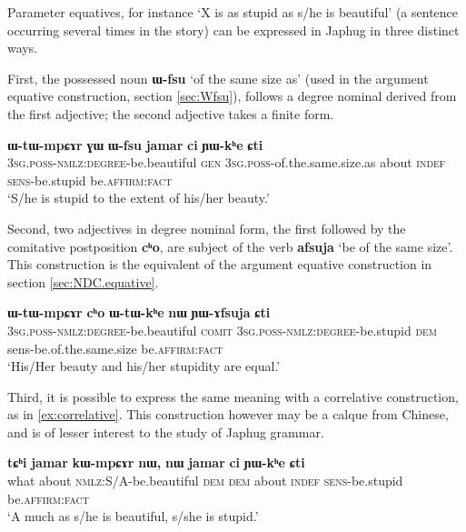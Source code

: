 \documentclass[oneside,a4paper,11pt]{article}
\newcommand{\ipa}[1]{{\phon\textbf{#1}}} %
\newcommand{\forme}[2]{\ipa{#1} `#2'}
\begin{document}
Parameter equatives, for instance `X is as stupid as s/he is beautiful' (a sentence occurring several times in the story) can be expressed in Japhug in three distinct ways.

First, the possessed noun \forme{ɯ-fsu}{of the same size as} (used in the argument equative construction, section \ref{sec:Wfsu}), follows a degree nominal derived from the first adjective; the second adjective takes a finite form.

\begin{exe}
\ex 
\gll 
\ipa{ɯ-tɯ-mpɕɤr} \ipa{ɣɯ} 	\ipa{ɯ-fsu} 	\ipa{jamar} 	\ipa{ci} 	\ipa{ɲɯ-kʰe} 	\ipa{ɕti} \\
\textsc{3sg.poss-nmlz:degree}-be.beautiful \textsc{gen} \textsc{3sg.poss}-of.the.same.size.as about \textsc{indef} \textsc{sens}-be.stupid be.\textsc{affirm:fact} \\
\glt `S/he is stupid to the extent of his/her beauty.'
\end{exe}

Second, two adjectives in degree nominal form, the first followed by the comitative postposition \ipa{cʰo}, are subject of the verb \forme{afsuja}{be of the same size}. This construction is the equivalent of the argument equative construction in section \ref{sec:NDC.equative}.

\begin{exe}
\ex \label{ex:YAfsuja}
\gll 
\ipa{ɯ-tɯ-mpɕɤr} 	\ipa{cʰo} 	\ipa{ɯ-tɯ-kʰe} 	\ipa{nɯ} 	\ipa{ɲɯ-ɤfsuja} 	\ipa{ɕti} \\
\textsc{3sg.poss-nmlz:degree}-be.beautiful \textsc{comit} \textsc{3sg.poss-nmlz:degree}-be.stupid \textsc{dem} sens-be.of.the.same.size be.\textsc{affirm:fact} \\
\glt `His/Her beauty and his/her stupidity are equal.'
\end{exe}

Third, it is possible to express the same meaning with a correlative construction, as in \ref{ex:correlative}. This construction however may be a calque from Chinese, and is of lesser interest to the study of Japhug grammar.

\begin{exe}
\ex \label{ex:correlative}
\gll 
\ipa{tɕʰi} 	\ipa{jamar} 	\ipa{kɯ-mpɕɤr} 	\ipa{nɯ,} 	\ipa{nɯ} 	\ipa{jamar} 	\ipa{ci} 	\ipa{ɲɯ-kʰe} 	\ipa{ɕti} \\
what about \textsc{nmlz}:S/A-be.beautiful \textsc{dem} \textsc{dem} about \textsc{indef} \textsc{sens}-be.stupid be.\textsc{affirm:fact} \\
\glt `A much as s/he is beautiful, s/she is stupid.'
\end{exe}
\end{document}
